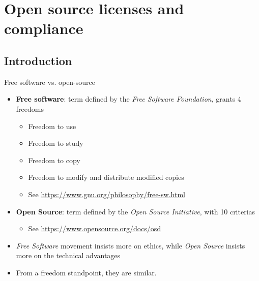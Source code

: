 \section{Open source licenses and compliance}

\subsection{Introduction}

\begin{frame}{Free software vs. open-source}
  \begin{itemize}
  \item {\bf Free software}: term defined by the {\em Free Software
      Foundation}, grants 4 freedoms
    \begin{itemize}
    \item Freedom to use
    \item Freedom to study
    \item Freedom to copy
    \item Freedom to modify and distribute modified copies
    \item See \url{https://www.gnu.org/philosophy/free-sw.html}
    \end{itemize}
  \item {\bf Open Source}: term defined by the {\em Open Source
      Initiative}, with 10 criterias
    \begin{itemize}
    \item See \url{https://www.opensource.org/docs/osd}
    \end{itemize}
  \item {\em Free Software} movement insists more on ethics, while
    {\em Open Source} insists more on the technical advantages
  \item From a freedom standpoint, they are similar.
  \end{itemize}
\end{frame}

